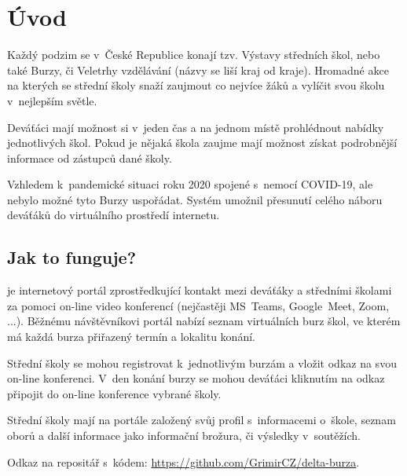 \chapter*{Úvod}

Každý podzim se v~České Republice konají tzv. Výstavy středních škol, nebo také Burzy, či Veletrhy vzdělávání (názvy se liší kraj od kraje). Hromadné akce na kterých se střední školy snaží zaujmout co nejvíce žáků  a vylíčit svou školu v~nejlepším světle.

Deváťáci mají možnost si v~jeden čas a na jednom místě prohlédnout nabídky jednotlivých škol. Pokud je nějaká škola zaujme mají možnost získat podrobnější informace od zástupců dané školy. 

Vzhledem k~pandemické situaci roku 2020 spojené s~nemocí COVID-19, ale nebylo možné tyto Burzy uspořádat. Systém \bso umožnil přesunutí celého náboru deváťáků do virtuálního prostředí internetu.

\section*{Jak to funguje?}
\bso je internetový portál zprostředkující kontakt mezi deváťáky a středními školami za pomoci on-line video konferencí (nejčastěji MS~Teams\cite{ms-teams}, Google~Meet\cite{google-meet}, Zoom\cite{zoom}, ...). Běžnému návštěvníkovi portál nabízí seznam virtuálních burz škol, ve kterém má každá burza přiřazený termín a lokalitu konání.

Střední školy se mohou registrovat k~jednotlivým burzám a vložit odkaz na svou on-line konferenci. V~den konání burzy se mohou deváťáci kliknutím na odkaz připojit do on-line konference vybrané školy.

Střední školy mají na portále založený svůj profil s~informacemi o~škole, seznam oborů a další informace jako informační brožura, či výsledky v~soutěžích.

Odkaz na repositář s~kódem: \href{https://github.com/GrimirCZ/delta-burza}{https://github.com/GrimirCZ/delta-burza}.

\pagebreak

